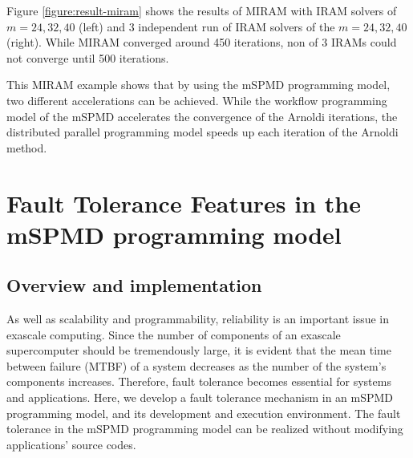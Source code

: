 \documentclass[graybox]{svmult}
\begin{document}
Figure \ref{figure:result-miram} shows the results of MIRAM with IRAM solvers of $m=24, 32, 40$ 
 (left) and 3 independent run of IRAM solvers of the $m=24, 32, 40$ (right). While MIRAM converged around 450 iterations, non of 3 IRAMs could not converge until 500 iterations. 

 This MIRAM example shows that by using the mSPMD programming model, two different accelerations can be achieved. While the workflow programming model of the mSPMD accelerates the convergence of the Arnoldi iterations, the distributed parallel programming model speeds up each iteration of the Arnoldi method. 


\section{Fault Tolerance Features in the mSPMD programming model}
\label{section:fault tolerance}

\subsection{Overview and implementation}

As well as scalability and programmability, reliability is an important issue in exascale computing. Since the number of components of an exascale supercomputer should be tremendously large, it is evident that the mean time between failure (MTBF) of a system decreases as the number of the system's components increases.  
Therefore, fault tolerance becomes essential for systems and applications. 
Here, we develop a fault tolerance mechanism in an mSPMD programming model, and its development and execution environment. The fault tolerance in the mSPMD programming model can be realized without modifying applications' source codes\cite{tsuji2015i}. 
\end{document}
